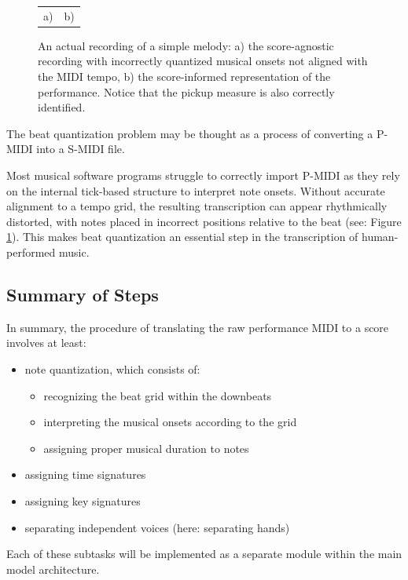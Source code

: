 \begin{figure}[ht!]
\centering
\begin{tabular}{cc}a)

 & b)
\end{tabular}
\caption[An actual recording of a simple melody.]{An actual recording of a simple melody: a) the score-agnostic recording with incorrectly quantized musical onsets not aligned with the MIDI tempo, b) the score-informed representation of the performance. Notice that the pickup measure is also correctly identified.}
\label{score_informed}
\end{figure}

The beat quantization problem may be thought as a process of converting a P-MIDI into a S-MIDI file.

Most musical software programs struggle to correctly import P-MIDI as they rely on the internal tick-based structure to interpret note onsets. Without accurate alignment to a tempo grid, the resulting transcription can appear rhythmically distorted, with notes placed in incorrect positions relative to the beat (see: Figure \ref{score_informed}). This makes beat quantization an essential step in the transcription of human-performed music.

\subsection{Summary of Steps}

In summary, the procedure of translating the raw performance MIDI to a score involves at least: \begin{itemize}
	\item note quantization, which consists of:
	\begin{itemize}
		\item recognizing the beat grid within the downbeats
		\item interpreting the musical onsets according to the grid
		\item assigning proper musical duration to notes	
	\end{itemize}
	\item assigning time signatures
	\item assigning key signatures
	\item separating independent voices (here: separating hands)
\end{itemize}

Each of these subtasks will be implemented as a separate module within the main model architecture.

